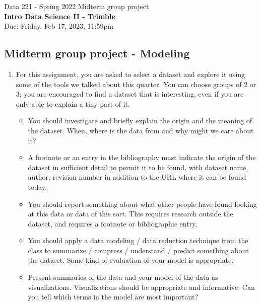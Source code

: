 \documentclass[]{book}
\theoremstyle{definition}
\begin{document}
\begin{center}
{\Large Data 221 - Spring 2022 \hspace{0.5cm} Midterm group project }\\
\textbf{Intro Data Science II - Trimble}\\ %
Due:  Friday, Feb 17, 2023, 11:59pm
\end{center}

\vspace{0.2 cm}

\subsection*{Midterm group project - Modeling }

\begin{enumerate}
\item\label{norms}

For this assignment, you are asked to select a dataset and explore it using some of the tools we talked about this quarter.  You can choose groups of 2 or 3; you are encouraged to find a dataset that is interesting, even if you are only able to explain a tiny part of it.

\begin{itemize}
\item  You should investigate and briefly explain the origin and the meaning of the dataset.  When, where is the data from and why might we care about it?  

\item A footnote or an entry in the bibliography must indicate the origin of the dataset in sufficient detail to permit it to be found, with dataset name, author, revision number in addition to the URL where it can be found today.  

\item You should report something about what other people have found looking at this data or data of this sort.  This requires research outside the dataset, and requires a footnote or bibliographic entry.

\item You should apply a data modeling / data reduction technique from the class to summarize / compress / understand / predict something about the dataset.  Some kind of evaluation of your model is appropriate.

\item  Present summaries of the data and your model of the data as visualizations.  Visualizations should be appropriate and informative.  Can you tell which terms in the model are most important?


\end{itemize}
\end{enumerate}
\end{document}
